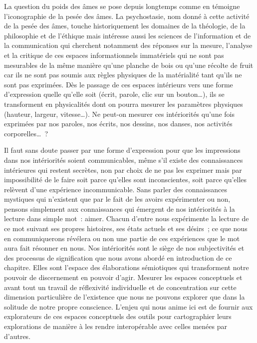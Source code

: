 \documentclass[
  letterpaper,
  DIV=11,
  numbers=noendperiod]{scrreprt}
\begin{document}
La question du poids des âmes se pose depuis longtemps comme en témoigne
l'iconographie de la pesée des âmes. La psychostasie, nom donné à cette
activité de la pesée des âmes, touche historiquement les domaines de la
théologie, de la philosophie et de l'éthique mais intéresse aussi les
sciences de l'information et de la communication qui cherchent notamment
des réponses sur la mesure, l'analyse et la critique de ces espaces
informationnels immatériels qui ne sont pas mesurables de la même
manière qu'une planche de bois ou qu'une récolte de fruit car ils ne
sont pas soumis aux règles physiques de la matérialité tant qu'ils ne
sont pas exprimées. Dès le passage de ces espaces intérieurs vers une
forme d'expression quelle qu'elle soit (écrit, parole, clic sur un
bouton\ldots), ils se transforment en physicalités dont on pourra
mesurer les paramètres physiques (hauteur, largeur, vitesse\ldots). Ne
peut-on mesurer ces intériorités qu'une fois exprimées par nos paroles,
nos écrits, nos dessins, nos danses, nos activités corporelles\ldots~?

Il faut sans doute passer par une forme d'expression pour que les
impressions dans nos intériorités soient communicables, même s'il existe
des connaissances intérieures qui restent secrètes, non par choix de ne
pas les exprimer mais par impossibilité de le faire soit parce qu'elles
sont inconscientes, soit parce qu'elles relèvent d'une expérience
incommunicable. Sans parler des connaissances mystiques qui n'existent
que par le fait de les avoirs expérimenter ou non, pensons simplement
aux connaissances qui émergent de nos intériorités à la lecture dans
simple mot~: aimer. Chacun d'entre nous expérimente la lecture de ce mot
suivant ses propres histoires, ses états actuels et ses désirs~; ce que
nous en communiquerons révélera ou non une partie de ces expériences que
le mot aura fait résonner en nous. Nos intériorités sont le siège de nos
subjectivités et des processus de signification que nous avons abordé en
introduction de ce chapitre. Elles sont l'espace des élaborations
sémiotiques qui transforment notre pouvoir de discernement en pouvoir
d'agir. Mesurer les espaces conceptuels et avant tout un travail de
réflexivité individuelle et de concentration sur cette dimension
particulière de l'existence que nous ne pouvons explorer que dans la
solitude de notre propre conscience. L'enjeu qui nous anime ici est de
fournir aux explorateurs de ces espaces conceptuels des outils pour
cartographier leurs explorations de manière à les rendre interopérable
avec celles menées par d'autres.
\end{document}
